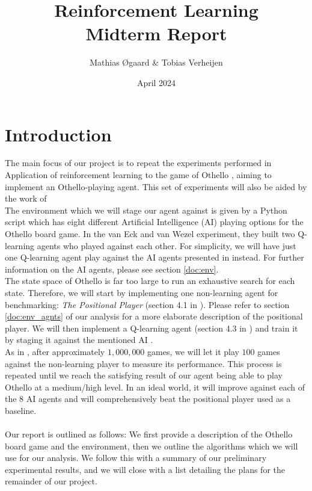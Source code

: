 \documentclass{article}
\title{Reinforcement Learning\\ \large{Midterm Report}}
\author{Mathias Øgaard \& Tobias Verheijen}
\date{April 2024}
\begin{document}
\maketitle

\tableofcontents

\section{Introduction}
The main focus of our project is to repeat the experiments performed in Application of reinforcement learning to the game of Othello \cite{vanEck2008}, aiming to implement an Othello-playing agent. This set of experiments will also be aided by the work of \cite{vdRee2013}\\
The environment which we will stage our agent against is given by a Python script \cite{codes} which has eight different Artificial Intelligence (AI) playing options for the Othello board game. In the van Eck and van Wezel experiment, they built two Q-learning agents who played against each other. For simplicity, we will have just one Q-learning agent play against the AI agents presented in \cite{codes} instead. For further information on the AI agents, please see section \ref{doc:env}.\\
The state space of Othello is far too large to run an exhaustive search for each state. Therefore, we will start by implementing one non-learning agent for benchmarking: \textit{The Positional Player} (section 4.1 in \cite{vanEck2008}). Please refer to section \ref{doc:env_agnts} of our analysis for a more elaborate description of the positional player. We will then implement a Q-learning agent (section 4.3 in \cite{vanEck2008}) and train it by staging it against the mentioned AI \cite{codes}.\\
As in \cite{vanEck2008}, after approximately $1,000,000$ games, we will let it play $100$ games against the non-learning player to measure its performance. This process is repeated until we reach the satisfying result of our agent being able to play Othello at a medium/high level. In an ideal world, it will improve against each of the 8 AI agents and will comprehensively beat the positional player used as a baseline.\\\\
Our report is outlined as follows: We first provide a description of the Othello board game and the environment, then we outline the algorithms which we will use for our analysis. We follow this with a summary of our preliminary experimental results, and we will close with a list detailing the plans for the remainder of our project.
\end{document}
